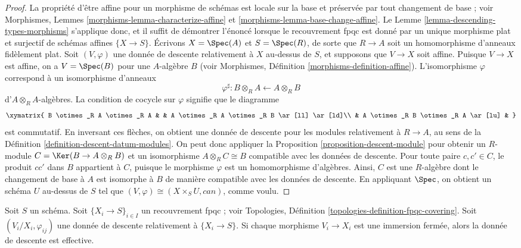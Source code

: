 \begin{proof}
La propriété d'être affine pour un morphisme de schémas est locale sur la base
et préservée par tout changement de base ; voir Morphismes,
Lemmes \ref{morphisms-lemma-characterize-affine} et
\ref{morphisms-lemma-base-change-affine}. Le
Lemme \ref{lemma-descending-types-morphisms} s'applique donc, et il suffit de
démontrer l'énoncé lorsque le recouvrement fpqc est donné par un unique
morphisme plat et surjectif de schémas affines $\{X \to S\}$. Écrivons
$X = \Spec(A)$ et $S = \Spec(R)$, de sorte que $R \to A$ soit un
homomorphisme d'anneaux fidèlement plat. Soit $(V, \varphi)$ une donnée de
descente relativement à $X$ au-dessus de $S$, et supposons que $V \to X$ soit
affine. Puisque $V \to X$ est affine, on a $V = \Spec(B)$ pour une
$A$-algèbre $B$ (voir Morphismes,
Définition \ref{morphisms-definition-affine}). L'isomorphisme $\varphi$
correspond à un isomorphisme d'anneaux
$$
\varphi^\sharp :
B \otimes_R A \longleftarrow A \otimes_R B
$$
d'$A \otimes_R A$-algèbres. La condition de cocycle sur $\varphi$ signifie que
le diagramme
$$
\xymatrix{
B \otimes_R A \otimes_R A & &
A \otimes_R A \otimes_R B \ar[ll] \ar[ld]\\
& A \otimes_R B \otimes_R A \ar[lu] &
}
$$
est commutatif. En inversant ces flèches, on obtient une donnée de descente
pour les modules relativement à $R \to A$, au sens de la
Définition \ref{definition-descent-datum-modules}. On peut donc appliquer la
Proposition \ref{proposition-descent-module} pour obtenir un $R$-module
$C = \Ker(B \to A \otimes_R B)$ et un isomorphisme
$A \otimes_R C \cong B$ compatible avec les données de descente. Pour toute
paire $c, c' \in C$, le produit $cc'$ dans $B$ appartient à $C$, puisque le
morphisme $\varphi$ est un homomorphisme d'algèbres. Ainsi, $C$ est une
$R$-algèbre dont le changement de base à $A$ est isomorphe à $B$ de manière
compatible avec les données de descente. En appliquant $\Spec$, on obtient un
schéma $U$ au-dessus de $S$ tel que
$(V, \varphi) \cong (X \times_S U, can)$, comme voulu.
\end{proof}

\begin{lemma}
\label{lemma-closed-immersion}
Soit $S$ un schéma. Soit $\{X_i \to S\}_{i\in I}$ un recouvrement fpqc ; voir
Topologies, Définition \ref{topologies-definition-fpqc-covering}. Soit
$(V_i/X_i, \varphi_{ij})$ une donnée de descente relativement à
$\{X_i \to S\}$. Si chaque morphisme $V_i \to X_i$ est une immersion fermée,
alors la donnée de descente est effective.
\end{lemma}

